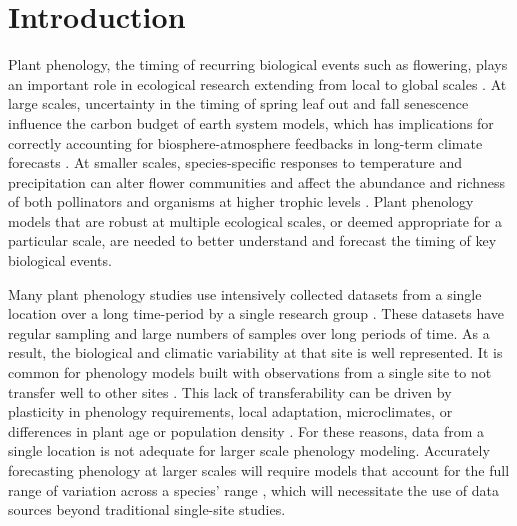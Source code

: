 \documentclass[fleqn,12pt,lineno]{article}
\begin{document}


\newpage
\section*{Introduction}

Plant phenology, the timing of recurring biological events such as flowering, plays an important role in ecological research extending from local to global scales \citep{cleland2007, richardson2013, tang2016}. At large scales, uncertainty in the timing of spring leaf out and fall senescence influence the carbon budget of earth system models, which has implications for correctly accounting for biosphere-atmosphere feedbacks in long-term climate forecasts \citep{richardson2012}. At smaller scales, species-specific responses to temperature and precipitation can alter flower communities \citep{diez2012, caradonna2014, theobald2017} and affect the abundance and richness of both pollinators \citep{ogilvie2017a, ogilvie2017b} and organisms at higher trophic levels \citep{tylianakis2008}. Plant phenology models that are robust at multiple ecological scales, or deemed appropriate for a particular scale, are needed to better understand and forecast the timing of key biological events.

Many plant phenology studies use intensively collected datasets from a single location over a long time-period by a single research group \citep{cook2012, wolkovich2012, iler2013, roberts2015}. These datasets have regular sampling and large numbers of samples over long periods of time. As a result, the biological and climatic variability at that site is well represented. It is common for phenology models built with observations from a single site to not transfer well to other sites \citep{garcia-mozo2008, xu2013, olsson2014, basler2016}. This lack of transferability can be driven by plasticity in phenology requirements, local adaptation, microclimates, or differences in plant age or population density \citep{kramer1995, diez2012}. For these reasons, data from a single location is not adequate for larger scale phenology modeling. Accurately forecasting phenology at larger scales will require models that account for the full range of variation across a species' range \citep{richardson2013, tang2016, chuine2017}, which will necessitate the use of data sources beyond traditional single-site studies.
\end{document}

